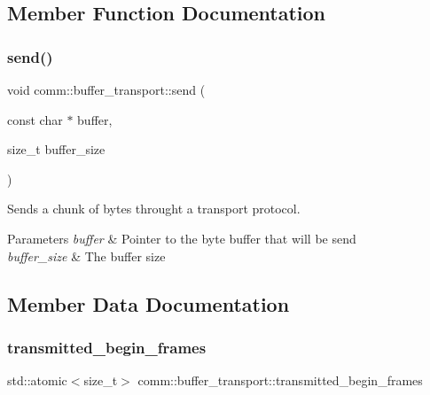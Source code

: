 \subsection{Member Function Documentation}
\mbox{\label{classcomm_1_1buffer__transport_a0a7ae6691d0a182c4567f3001f96aefe}} 
\subsubsection{\texorpdfstring{send()}{send()}}
{\footnotesize\ttfamily void comm\+::buffer\+\_\+transport\+::send (\begin{DoxyParamCaption}\item[{const char $\ast$}]{buffer,  }\item[{size\+\_\+t}]{buffer\+\_\+size }\end{DoxyParamCaption})}



Sends a chunk of bytes throught a transport protocol. 


\begin{DoxyParams}{Parameters}
{\em buffer} & Pointer to the byte buffer that will be send \\
\hline
{\em buffer\+\_\+size} & The buffer size \\
\hline
\end{DoxyParams}


\subsection{Member Data Documentation}
\mbox{\label{classcomm_1_1buffer__transport_af9c04a8af736e05980d62b7448142b30}} 
\subsubsection{\texorpdfstring{transmitted\+\_\+begin\+\_\+frames}{transmitted\_begin\_frames}}
{\footnotesize\ttfamily std\+::atomic$<$size\+\_\+t$>$ comm\+::buffer\+\_\+transport\+::transmitted\+\_\+begin\+\_\+frames\hspace{0.3cm}{\ttfamily [protected]}}

